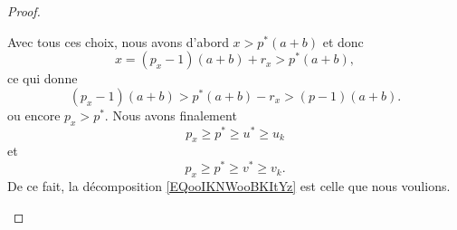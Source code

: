 \begin{proof}
\begin{subproof}
\item[Conclusion]

    Avec tous ces choix, nous avons d'abord \( x>p^*(a+b)\) et donc
    \begin{equation}
        x=(p_x-1)(a+b)+r_x>p^*(a+b),
    \end{equation}
    ce qui donne
    \begin{equation}
        (p_x-1)(a+b)>p^*(a+b)-r_x>(p-1)(a+b).
    \end{equation}
    ou encore \( p_x>p^*\). Nous avons finalement
    \begin{equation}
       p_x \geq p^* \geq u^* \geq u_k
    \end{equation}
    et
    \begin{equation}
       p_x \geq p^* \geq v^* \geq v_k.
    \end{equation}
    De ce fait, la décomposition \eqref{EQooIKNWooBKItYz} est celle que nous voulions.
    \end{subproof}
\end{proof}

%

